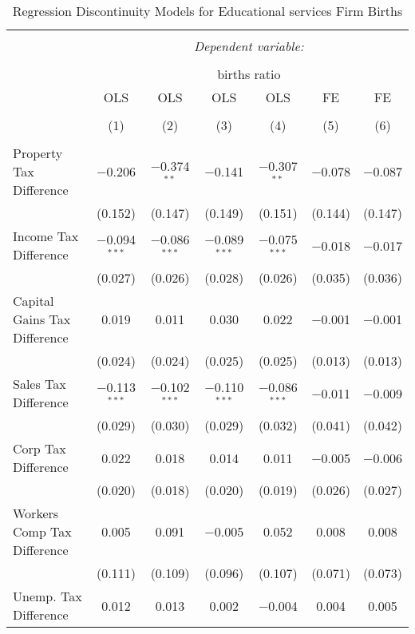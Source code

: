 
\begin{table}[!htbp] \centering 
  \caption{Regression Discontinuity Models for  Educational services Firm Births} 
  \label{61rd} 
\begin{tabular}{@{\extracolsep{5pt}}lcccccc} 
\\[-1.8ex]\hline 
\hline \\[-1.8ex] 
 & \multicolumn{6}{c}{\textit{Dependent variable:}} \\ 
\cline{2-7} 
\\[-1.8ex] & \multicolumn{6}{c}{births ratio} \\ 
 & OLS & OLS & OLS & OLS & FE & FE \\ 
\\[-1.8ex] & (1) & (2) & (3) & (4) & (5) & (6)\\ 
\hline \\[-1.8ex] 
 Property Tax Difference & $-$0.206 & $-$0.374$^{**}$ & $-$0.141 & $-$0.307$^{**}$ & $-$0.078 & $-$0.087 \\ 
  & (0.152) & (0.147) & (0.149) & (0.151) & (0.144) & (0.147) \\ 
  Income Tax Difference & $-$0.094$^{***}$ & $-$0.086$^{***}$ & $-$0.089$^{***}$ & $-$0.075$^{***}$ & $-$0.018 & $-$0.017 \\ 
  & (0.027) & (0.026) & (0.028) & (0.026) & (0.035) & (0.036) \\ 
  Capital Gains Tax Difference & 0.019 & 0.011 & 0.030 & 0.022 & $-$0.001 & $-$0.001 \\ 
  & (0.024) & (0.024) & (0.025) & (0.025) & (0.013) & (0.013) \\ 
  Sales Tax Difference & $-$0.113$^{***}$ & $-$0.102$^{***}$ & $-$0.110$^{***}$ & $-$0.086$^{***}$ & $-$0.011 & $-$0.009 \\ 
  & (0.029) & (0.030) & (0.029) & (0.032) & (0.041) & (0.042) \\ 
  Corp Tax Difference & 0.022 & 0.018 & 0.014 & 0.011 & $-$0.005 & $-$0.006 \\ 
  & (0.020) & (0.018) & (0.020) & (0.019) & (0.026) & (0.027) \\ 
  Workers Comp Tax Difference & 0.005 & 0.091 & $-$0.005 & 0.052 & 0.008 & 0.008 \\ 
  & (0.111) & (0.109) & (0.096) & (0.107) & (0.071) & (0.073) \\ 
  Unemp. Tax Difference & 0.012 & 0.013 & 0.002 & $-$0.004 & 0.004 & 0.005 \\ 

\end{tabular}
\end{table}
